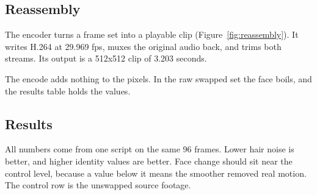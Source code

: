 \subsection{Reassembly}
The encoder turns a frame set into a playable clip (Figure~\ref{fig:reassembly}). It writes H.264 at 29.969 fps, muxes the original audio back, and trims both streams. Its output is a 512x512 clip of 3.203 seconds.

The encode adds nothing to the pixels. In the raw swapped set the face boils, and the results table holds the values.


\subsection{Results}
All numbers come from one script on the same 96 frames. Lower hair noise is better, and higher identity values are better. Face change should sit near the control level, because a value below it means the smoother removed real motion. The control row is the unswapped source footage.

